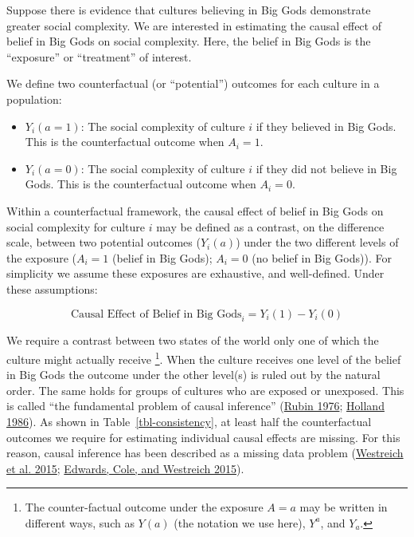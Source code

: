 \documentclass[
  singlecolumn]{report}
\providecommand{\tightlist}{%
  \setlength{\itemsep}{0pt}\setlength{\parskip}{0pt}}\usepackage{longtable,booktabs,array}
\begin{document}
Suppose there is evidence that cultures believing in Big Gods
demonstrate greater social complexity. We are interested in estimating
the causal effect of belief in Big Gods on social complexity. Here, the
belief in Big Gods is the ``exposure'' or ``treatment'' of interest.

We define two counterfactual (or ``potential'') outcomes for each
culture in a population:

\begin{itemize}
\tightlist
\item
  \(Y_i(a = 1)\): The social complexity of culture \(i\) if they
  believed in Big Gods. This is the counterfactual outcome when
  \(A_i = 1\).
\item
  \(Y_i(a = 0)\): The social complexity of culture \(i\) if they did not
  believe in Big Gods. This is the counterfactual outcome when
  \(A_i = 0\).
\end{itemize}

Within a counterfactual framework, the causal effect of belief in Big
Gods on social complexity for culture \(i\) may be defined as a
contrast, on the difference scale, between two potential outcomes
(\(Y_i(a)\)) under the two different levels of the exposure (\(A_i = 1\)
(belief in Big Gods); \(A_i = 0\) (no belief in Big Gods)). For
simplicity we assume these exposures are exhaustive, and well-defined.
Under these assumptions:

\[
\text{Causal Effect of Belief in Big Gods}_i = Y_i(1) - Y_i(0) 
\]

We require a contrast between two states of the world only one of which
the culture might actually receive \footnote{The counter-factual outcome
  under the exposure \(A = a\) may be written in different ways, such as
  \(Y(a)\) (the notation we use here), \(Y^a\), and \(Y_a\).}. When the
culture receives one level of the belief in Big Gods the outcome under
the other level(s) is ruled out by the natural order. The same holds for
groups of cultures who are exposed or unexposed. This is called ``the
fundamental problem of causal inference''
(\protect\hyperlink{ref-rubin1976}{Rubin 1976};
\protect\hyperlink{ref-holland1986}{Holland 1986}). As shown in
Table~\ref{tbl-consistency}, at least half the counterfactual outcomes
we require for estimating individual causal effects are missing. For
this reason, causal inference has been described as a missing data
problem (\protect\hyperlink{ref-westreich2015}{Westreich et al. 2015};
\protect\hyperlink{ref-edwards2015}{Edwards, Cole, and Westreich 2015}).
\end{document}
